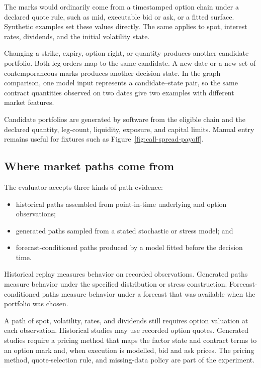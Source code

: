 \documentclass{strategynet-journal}
\begin{document}
\begin{SNcolumns}
The marks would ordinarily come from a timestamped option chain under a
declared quote rule, such as mid, executable bid or ask, or a fitted surface.
Synthetic examples set these values directly.  The same applies to spot,
interest rates, dividends, and the initial volatility state.

Changing a strike, expiry, option right, or quantity produces another
candidate portfolio.  Both leg orders map to the same candidate.  A new date
or a new set of contemporaneous marks produces another decision state.  In the
graph comparison, one model input represents a candidate--state pair, so the
same contract quantities observed on two dates give two examples with
different market features.

Candidate portfolios are generated by software from the eligible chain and
the declared quantity, leg-count, liquidity, exposure, and capital limits.
Manual entry remains useful for fixtures such as
Figure~\ref{fig:call-spread-payoff}.

\subsection{Where market paths come from}

The evaluator accepts three kinds of path evidence:

\begin{itemize}
  \item historical paths assembled from point-in-time underlying and option
        observations;
  \item generated paths sampled from a stated stochastic or stress model; and
  \item forecast-conditioned paths produced by a model fitted before the
        decision time.
\end{itemize}

Historical replay measures behavior on recorded observations.  Generated
paths measure behavior under the specified distribution or stress
construction.  Forecast-conditioned paths measure behavior under a forecast
that was available when the portfolio was chosen.

A path of spot, volatility, rates, and dividends still requires option
valuation at each observation.  Historical studies may use recorded option
quotes.  Generated studies require a pricing method that maps the factor state
and contract terms to an option mark and, when execution is modelled, bid and
ask prices.  The pricing method, quote-selection rule, and missing-data policy
are part of the experiment.


\end{SNcolumns}
\end{document}

